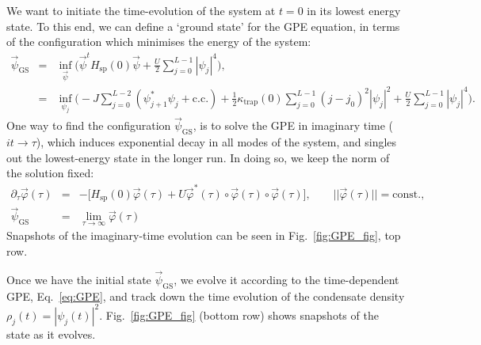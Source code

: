 \documentclass{SciPost}
\newcommand\0{\scalebox{-1}[1]{0}}
\begin{document}
We want to initiate the time-evolution of the system at $t=0$ in its lowest energy state. To this end, we can define a `ground state' for the GPE equation, in terms of the configuration which minimises the energy of the system:
\begin{eqnarray}
\vec\psi_\mathrm{GS} &=& \inf_{\vec{\psi}} \bigg( \vec\psi^t H_\mathrm{sp}(0)\vec{\psi} + \frac{U}{2}\sum_{j=0}^{L-1}|\psi_j|^4\bigg),\nonumber\\
&=&\inf_{\psi_j} \bigg(-J\sum_{j=0}^{L-2} (\psi_{j+1}^*\psi_j + \mathrm{c.c.}) + \frac{1}{2}\kappa_\mathrm{trap}(0)\sum_{j=0}^{L-1}(j-j_0)^2|\psi_j|^2 + \frac{U}{2}\sum_{j=0}^{L-1}|\psi_j|^4\bigg).
\end{eqnarray} 
One way to find the configuration $\vec\psi_\mathrm{GS}$, is to solve the GPE in imaginary time ($it\to \tau$), which induces exponential decay in all modes of the system, and singles out the lowest-energy state in the longer run. In doing so, we keep the norm of the solution fixed:
\begin{eqnarray}
\label{eq:GPE_imag}
\partial_{\tau}\vec\varphi(\tau) &=& -\bigg[H_\mathrm{sp}(0)\vec\varphi(\tau) + U {\vec\varphi}^*(\tau)\circ \vec\varphi(\tau)\circ \vec\varphi(\tau)\bigg],\qquad ||\vec\varphi(\tau)||=\mathrm{const.},\nonumber\\
\vec{\psi}_\mathrm{GS} &=& \lim_{\tau\to\infty}\vec\varphi(\tau)
\end{eqnarray}
Snapshots of the imaginary-time evolution can be seen in Fig.~\eqref{fig:GPE_fig}, top row.

Once we have the initial state $\vec\psi_\mathrm{GS}$, we evolve it according to the time-dependent GPE, Eq.~\eqref{eq:GPE}, and track down the time evolution of the condensate density $\rho_j(t)=|\psi_j(t)|^2$. Fig.~\ref{fig:GPE_fig} (bottom row) shows snapshots of the state as it evolves.
\end{document}

